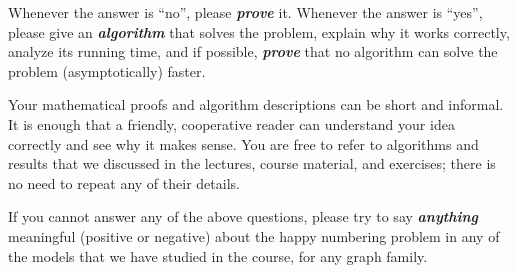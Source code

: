 \documentclass[12pt,a4paper]{article}
\newcommand{\cemph}[1]{\textbf{\emph{\boldmath #1}}}
\begin{document}
Whenever the answer is ``no'', please \cemph{prove} it. Whenever the answer is ``yes'', please give an \cemph{algorithm} that solves the problem, explain why it works correctly, analyze its running time, and if possible, \cemph{prove} that no algorithm can solve the problem (asymptotically) faster.

Your mathematical proofs and algorithm descriptions can be short and informal. It is enough that a friendly, cooperative reader can understand your idea correctly and see why it makes sense. You are free to refer to algorithms and results that we discussed in the lectures, course material, and exercises; there is no need to repeat any of their details.

If you cannot answer any of the above questions, please try to say \cemph{anything} meaningful (positive or negative) about the happy numbering problem in any of the models that we have studied in the course, for any graph family.
\end{document}
